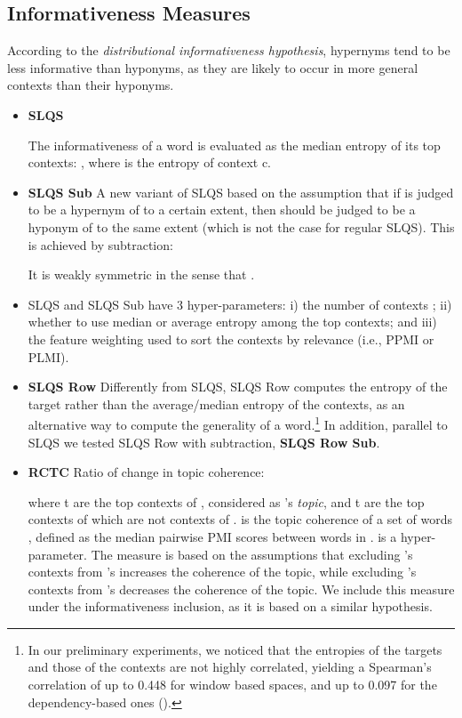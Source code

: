 \documentclass[11pt]{article}
\begin{document}
\subsection{Informativeness Measures}
\label{sec:informativeness_measures}

According to the \emph{distributional informativeness hypothesis}, hypernyms tend to be less informative than hyponyms, as they are likely to occur in more general contexts than their hyponyms.

\begin{itemize}[leftmargin=*]

	\item \textbf{SLQS} \cite{santus2014chasing} 
	
	The informativeness of a word  is evaluated as the median entropy of its top  contexts: , where  is the entropy of context c. 
	
	\item \textbf{SLQS Sub} A new variant of SLQS based on the assumption that if  is judged to be a hypernym of  to a certain extent, then  should be judged to be a hyponym of  to the same extent (which is not the case for regular SLQS). This is achieved by subtraction: 
	
	
	\noindent It is weakly symmetric in the sense that .
	
	\item[] SLQS and SLQS Sub have 3 hyper-parameters: i) the number of contexts ; ii) whether to use median or average entropy among the top  contexts;
	and iii) the feature weighting used to sort the contexts by relevance (i.e., PPMI or PLMI).
	
	\item \textbf{SLQS Row} Differently from SLQS, SLQS Row computes the entropy of the target rather than the average/median entropy of the contexts, as an alternative way to compute the generality of a word.\footnote{In our preliminary experiments, we noticed that the entropies of the targets and those of the contexts are not highly correlated, yielding a Spearman's correlation of up to 0.448 for window based spaces, and up to 0.097 for the dependency-based ones ().} In addition, parallel to SLQS we tested SLQS Row with subtraction, \textbf{SLQS Row Sub}.
	
	\item \textbf{RCTC} \cite{rimell2014distributional} Ratio of change in topic coherence: 
	\small
	
	\normalsize
	\noindent where t are the top  contexts of , considered as 's \emph{topic}, and t are the top  contexts of  which are not contexts of .  is the topic coherence of a set of words , defined as the median pairwise PMI scores between words in .  is a hyper-parameter. The measure is based on the assumptions that excluding 's contexts from 's increases the coherence of the topic, while excluding 's contexts from 's decreases the coherence of the topic. We include this measure under the informativeness inclusion, as it is based on a similar hypothesis.
	
\end{itemize}
\end{document}
